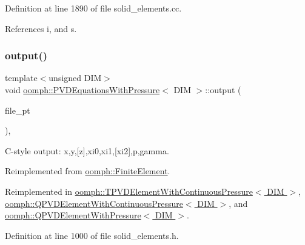 Definition at line 1890 of file solid\+\_\+elements.\+cc.



References i, and s.

\mbox{\label{classoomph_1_1PVDEquationsWithPressure_ae6d9a646cfd9be12134aeba45249d7c7}} 
\subsubsection{\texorpdfstring{output()}{output()}\hspace{0.1cm}{\footnotesize\ttfamily [3/4]}}
{\footnotesize\ttfamily template$<$unsigned D\+IM$>$ \\
void \hyperlink{classoomph_1_1PVDEquationsWithPressure}{oomph\+::\+P\+V\+D\+Equations\+With\+Pressure}$<$ D\+IM $>$\+::output (\begin{DoxyParamCaption}\item[{F\+I\+LE $\ast$}]{file\+\_\+pt }\end{DoxyParamCaption})\hspace{0.3cm}{\ttfamily [inline]}, {\ttfamily [virtual]}}



C-\/style output\+: x,y,\mbox{[}z\mbox{]},xi0,xi1,\mbox{[}xi2\mbox{]},p,gamma. 



Reimplemented from \hyperlink{classoomph_1_1FiniteElement_a72cddd09f8ddbee1a20a1ff404c6943e}{oomph\+::\+Finite\+Element}.



Reimplemented in \hyperlink{classoomph_1_1TPVDElementWithContinuousPressure_a082f3c2e891783a923daeaee5686203c}{oomph\+::\+T\+P\+V\+D\+Element\+With\+Continuous\+Pressure$<$ D\+I\+M $>$}, \hyperlink{classoomph_1_1QPVDElementWithContinuousPressure_ae44d9dd8f7a28dafd17e20a0408f4708}{oomph\+::\+Q\+P\+V\+D\+Element\+With\+Continuous\+Pressure$<$ D\+I\+M $>$}, and \hyperlink{classoomph_1_1QPVDElementWithPressure_adf19767f05bb8227c56b011c3f6931e5}{oomph\+::\+Q\+P\+V\+D\+Element\+With\+Pressure$<$ D\+I\+M $>$}.



Definition at line 1000 of file solid\+\_\+elements.\+h.



